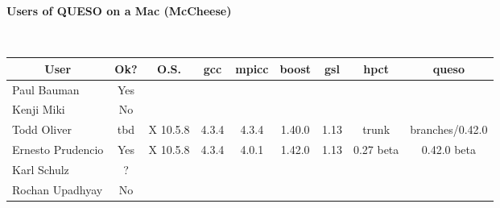 \documentclass[12pt,letterpaper,twoside,onecolumn,portrait,leqno]{book}
\begin{document}
\setlength{\unitlength}{1.0in}
\setlength{\parindent}{0cm}
\setlength{\parskip}{2ex}
\thispagestyle{empty}

\centerline{\bf Users of QUESO on a Mac (McCheese)}

$~$\\

\begin{table}[!h]
\begin{center}
\begin{tabular}{|l|c|c|c|c|c|c|c|c|}
\hline
\multicolumn{1}{|c|}{User} & Ok? & O.S.     & gcc    & mpicc   & boost  & gsl   & hpct      & queso       \\
\hline
\hline
Paul Bauman                & Yes &          &        &         &        &       &           &             \\
\hline
Kenji Miki                 & No  &          &        &         &        &       &           &             \\
\hline
Todd Oliver                & tbd & X 10.5.8 & 4.3.4  & 4.3.4   & 1.40.0 & 1.13  & trunk     & branches/0.42.0      \\
\hline
Ernesto Prudencio          & Yes & X 10.5.8 & 4.3.4  & 4.0.1   & 1.42.0 & 1.13  & 0.27 beta & 0.42.0 beta \\
\hline
Karl Schulz                & ?   &          &        &         &        &       &           &             \\
\hline
Rochan Upadhyay            & No  &          &        &         &        &       &           &             \\
\hline
\end{tabular}
\end{center}
\end{table}
\end{document}
